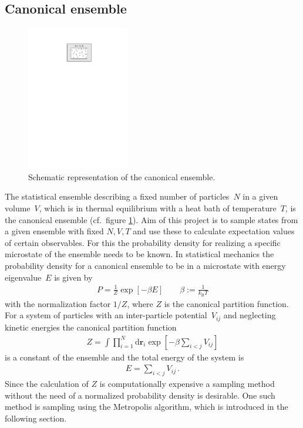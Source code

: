 \documentclass[11pt, a4paper]{article}
\numberwithin{equation}{section}
\begin{document}
\subsection{Canonical ensemble} \label{sec:Canonical_Ensemble}
\begin{figure}
	\centering
	\includegraphics[width=0.4\textwidth]{./figures/canonical_ensemble.pdf}
	\caption{Schematic representation of the canonical ensemble.}
	\label{fig:canonical_ensemble}
\end{figure}
The statistical ensemble describing a fixed number of particles~$N$ in a given volume~$V$, which is in thermal equilibrium with a heat bath of temperature~$T$, is the canonical ensemble (cf.\ figure \ref{fig:canonical_ensemble}).
Aim of this project is to sample states from a given ensemble with fixed $N, V, T$ and use these to calculate expectation values of certain observables.
For this the probability density for realizing a specific microstate of the ensemble needs to be known.
In statistical mechanics the probability density for a canonical ensemble to be in a microstate with energy eigenvalue~$E$ is given by \cite{schwabl}
\begin{align*}
	P = \frac{1}{Z} \exp\left[ -\beta E \right] \qquad \beta := \frac{1}{k_\mathrm{B} T}
\end{align*}
with the normalization factor $1/Z$, where $Z$ is the canonical partition function.
For a system of particles with an inter-particle potential~$V_{ij}$ and neglecting kinetic energies the canonical partition function
\begin{align*}
	Z = \int \prod_{i=1}^N \mathrm{d}\mathbf{r}_i \exp\left[ -\beta \sum_{i < j} V_{ij} \right]
\end{align*}
is a constant of the ensemble and the total energy of the system is
\begin{align*}
	E = \sum_{i < j} V_{ij} \, \text{.}
\end{align*}
Since the calculation of $Z$ is computationally expensive a sampling method without the need of a normalized probability density is desirable.
One such method is sampling using the Metropolis algorithm, which is introduced in the following section.
\end{document}
